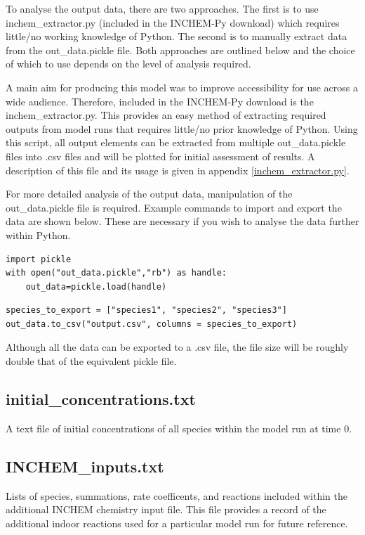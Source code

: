 \documentclass[a4paper]{refart}
\begin{document}
To analyse the output data, there are two approaches. The first is to use inchem\_extractor.py (included in the INCHEM-Py download) which requires little/no working knowledge of Python. The second is to manually extract data from the out\_data.pickle file. Both approaches are outlined below and the choice of which to use depends on the level of analysis required.


A main aim for producing this model was to improve accessibility for use across a wide audience. Therefore, included in the INCHEM-Py download is the inchem\_extractor.py. This provides an easy method of extracting required outputs from model runs that requires little/no prior knowledge of Python. Using this script, all output elements can be extracted from multiple out\_data.pickle files into .csv files and will be plotted for initial assessment of results. A description of this file and its usage is given in appendix \ref{inchem_extractor.py}.


For more detailed analysis of the output data, manipulation of the out\_data.pickle file is required. Example commands to import and export the data are shown below. These are necessary if you wish to analyse the data further within Python.

\begin{verbatim}
import pickle
with open("out_data.pickle","rb") as handle:
    out_data=pickle.load(handle)
\end{verbatim}

\begin{verbatim}
species_to_export = ["species1", "species2", "species3"]
out_data.to_csv("output.csv", columns = species_to_export)
\end{verbatim}
Although all the data can be exported to a .csv file, the file size will be roughly double that of the equivalent pickle file.

\subsection{initial\_concentrations.txt}
A text file of initial concentrations of all species within the model run at time 0.

\subsection{INCHEM\_inputs.txt}
Lists of species, summations, rate coefficents, and reactions included within the additional INCHEM chemistry input file. This file provides a record of the additional indoor reactions used for a particular model run for future reference.
\end{document}
